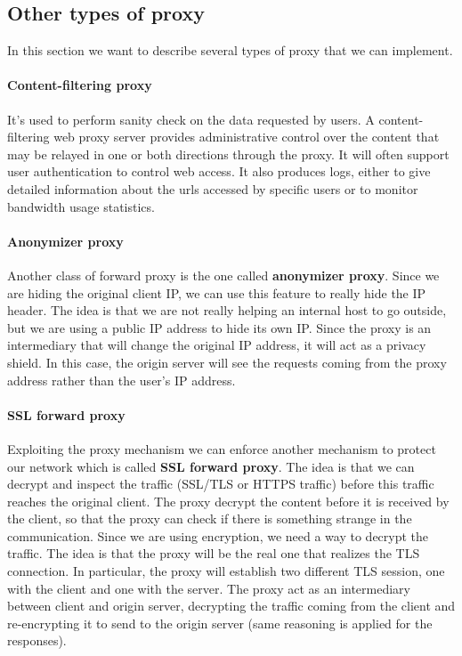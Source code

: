 \documentclass[11pt]{article}
\begin{document}
\subsection{Other types of proxy}
In this section we want to describe several types of proxy that we can implement.
\paragraph{Content-filtering proxy} It's used to perform sanity check on the data requested by users. A content-filtering web proxy server provides administrative control over the content that may be relayed in one or both directions through the proxy. It will often support user authentication to control web access. It also produces logs, either to give detailed information about the urls accessed by specific users or to monitor bandwidth usage statistics. 
\paragraph{Anonymizer proxy} Another class of forward proxy is the one called \textbf{anonymizer proxy}. Since we are hiding the original client IP, we can use this feature to really hide the IP header. The idea is that we are not really helping an internal host to go outside, but we are using a public IP address to hide its own IP. Since the proxy is an intermediary that will change the original IP address, it will act as a privacy shield. In this case, the origin server will see the requests coming from the proxy address rather than the user's IP address.
\paragraph{SSL forward proxy} Exploiting the proxy mechanism we can enforce another mechanism to protect our network which is called \textbf{SSL forward proxy}. The idea is that we can decrypt and inspect the traffic (SSL/TLS or HTTPS traffic) before this traffic reaches the original client. The proxy decrypt the content before it is received by the client, so that the proxy can check if there is something strange in the communication. Since we are using encryption, we need a way to decrypt the traffic. The idea is that the proxy will be the real one that realizes the TLS connection. In particular, the proxy will establish two different TLS session, one with the client and one with the server. The proxy act as an intermediary between client and origin server, decrypting the traffic coming from the client and re-encrypting it to send to the origin server (same reasoning is applied for the responses). 
\end{document}
